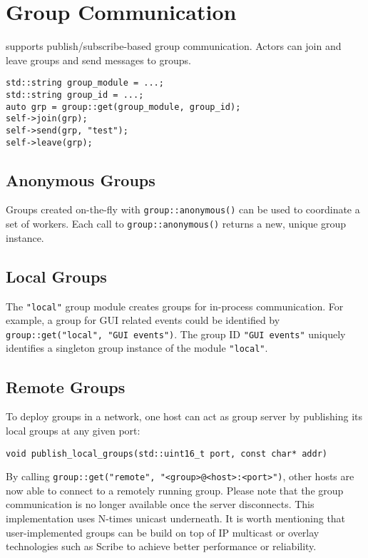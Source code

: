\section{Group Communication}
\label{Sec::Group}

\lib supports publish/subscribe-based group communication.
Actors can join and leave groups and send messages to groups.

\begin{lstlisting}
std::string group_module = ...;
std::string group_id = ...;
auto grp = group::get(group_module, group_id);
self->join(grp);
self->send(grp, "test");
self->leave(grp);
\end{lstlisting}

\subsection{Anonymous Groups}
\label{Sec::Group::Anonymous}

Groups created on-the-fly with \lstinline^group::anonymous()^ can be used to coordinate a set of workers.
Each call to \lstinline^group::anonymous()^ returns a new, unique group instance.

\subsection{Local Groups}
\label{Sec::Group::Local}

The \lstinline^"local"^ group module creates groups for in-process communication.
For example, a group for GUI related events could be identified by \lstinline^group::get("local", "GUI events")^.
The group ID \lstinline^"GUI events"^ uniquely identifies a singleton group instance of the module \lstinline^"local"^.

\subsection{Remote Groups}
\label{Sec::Group::RemoteGroups}

To deploy groups in a network, one host can act as group server by publishing its local groups at any given port:

\begin{lstlisting}
void publish_local_groups(std::uint16_t port, const char* addr)
\end{lstlisting}

By calling \lstinline^group::get("remote", "<group>@<host>:<port>")^, other hosts are now able to connect to a remotely running group.
Please note that the group communication is no longer available once the server disconnects.
This implementation uses N-times unicast underneath.
It is worth mentioning that user-implemented groups can be build on top of IP multicast or overlay technologies such as Scribe to achieve better performance or reliability.

